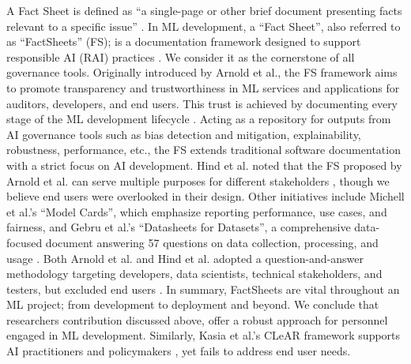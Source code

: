 \documentclass[manuscript,screen,review]{acmart}
\begin{document}
	
	A Fact Sheet is defined as “a single-page or other brief document presenting facts relevant to a specific issue” \cite{oxford_university_press_fact_nodate}. In ML development, a \enquote{Fact Sheet}, also referred to as \enquote{FactSheets} (FS); is a documentation framework designed to support responsible AI (RAI) practices \cite{arnold_factsheets_2018}. We consider it as the cornerstone of all governance tools. Originally introduced by Arnold et al., the FS framework aims to promote transparency and trustworthiness in ML services and applications for auditors, developers, and end users. This trust is achieved by documenting every stage of the ML development lifecycle \cite{arnold_factsheets_2018}. Acting as a repository for outputs from AI governance tools such as bias detection and mitigation, explainability, robustness, performance, etc., the FS extends traditional software documentation with a strict focus on AI development. Hind et al. noted that the FS proposed by Arnold et al. can serve multiple purposes for different stakeholders \cite{hind_experiences_2020}, though we believe end users were overlooked in their design. Other initiatives include Michell et al.’s “Model Cards”, which emphasize reporting performance, use cases, and fairness, and Gebru et al.’s “Datasheets for Datasets”, a comprehensive data-focused document answering 57 questions on data collection, processing, and usage \cite{mitchell_model_2019} \cite{gebru_datasheets_2021}. Both Arnold et al. and Hind et al. adopted a question-and-answer methodology targeting developers, data scientists, technical stakeholders, and testers, but excluded end users \cite{arnold_factsheets_2018} \cite{hind_experiences_2020}. In summary, FactSheets are vital throughout an ML project; from development to deployment and beyond. We conclude that researchers contribution discussed above, offer a robust approach for personnel engaged in ML development. Similarly, Kasia et al.’s CLeAR framework supports AI practitioners and policymakers \cite{chmielinski2024the}, yet fails to address end user needs.
	
\end{document}

